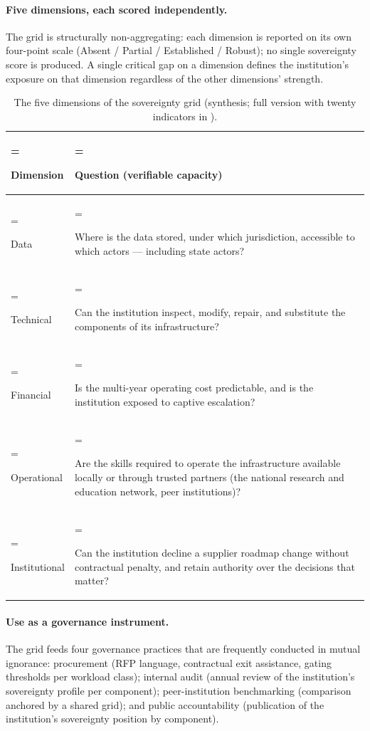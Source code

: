 \paragraph{Five dimensions, each scored independently.} The grid
is structurally non-aggregating: each dimension is reported on
its own four-point scale (Absent / Partial / Established /
Robust); no single sovereignty score is produced. A single
critical gap on a dimension defines the institution's exposure on
that dimension regardless of the other dimensions' strength.

\begin{table}[H]
\centering\small
\caption{The five dimensions of the sovereignty grid (synthesis;
full version with twenty indicators in
).}
\label{tab:synth-sovereignty}
\begin{tabularx}{\textwidth}{%
  >{\hsize=0.4\hsize\linewidth=\hsize\bfseries\raggedright\arraybackslash}X%
  >{\hsize=1.6\hsize\linewidth=\hsize\raggedright\arraybackslash}X%
}
\toprule
Dimension & Question (verifiable capacity) \\
\midrule
Data
  & Where is the data stored, under which jurisdiction, accessible
    to which actors --- including state actors? \\
\addlinespace
Technical
  & Can the institution inspect, modify, repair, and substitute
    the components of its infrastructure? \\
\addlinespace
Financial
  & Is the multi-year operating cost predictable, and is the
    institution exposed to captive escalation? \\
\addlinespace
Operational
  & Are the skills required to operate the infrastructure
    available locally or through trusted partners (the national
    research and education network, peer institutions)? \\
\addlinespace
Institutional
  & Can the institution decline a supplier roadmap change without
    contractual penalty, and retain authority over the decisions
    that matter? \\
\bottomrule
\end{tabularx}
\end{table}

\paragraph{Use as a governance instrument.} The grid feeds four
governance practices that are frequently
conducted in mutual ignorance: procurement (RFP language,
contractual exit assistance, gating thresholds per workload
class); internal audit (annual review of the institution's
sovereignty profile per component); peer-institution benchmarking
(comparison anchored by a shared grid); and public accountability
(publication of the institution's sovereignty position by
component).

